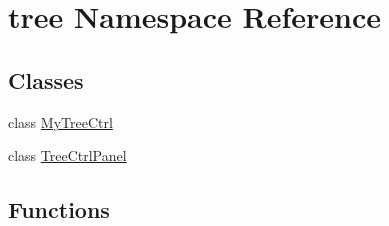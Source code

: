 \hypertarget{namespacetree}{}\section{tree Namespace Reference}
\label{namespacetree}
\subsection*{Classes}
\begin{DoxyCompactItemize}
\item 
class \hyperlink{classtree_1_1MyTreeCtrl}{My\+Tree\+Ctrl}
\item 
class \hyperlink{classtree_1_1TreeCtrlPanel}{Tree\+Ctrl\+Panel}
\end{DoxyCompactItemize}
\subsection*{Functions}
